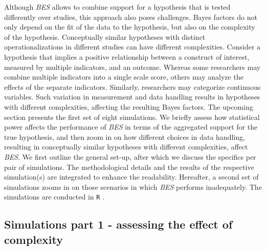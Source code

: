 \documentclass[
]{article}
\begin{document}
Although \emph{BES} allows to combine support for a hypothesis that is
tested differently over studies, this approach also poses challenges.
Bayes factors do not only depend on the fit of the data to the
hypothesis, but also on the complexity of the hypothesis. Conceptually
similar hypotheses with distinct operationalizations in different
studies can have different complexities. Consider a hypothesis that
implies a positive relationship between a construct of interest,
measured by multiple indicators, and an outcome. Whereas some
researchers may combine multiple indicators into a single scale score,
others may analyze the effects of the separate indicators. Similarly,
researchers may categorize continuous variables. Such variation in
measurement and data handling results in hypotheses with different
complexities, affecting the resulting Bayes factors. The upcoming
section presents the first set of eight simulations. We briefly assess
how statistical power affects the performance of \emph{BES} in terms of
the aggregated support for the true hypothesis, and then zoom in on how
different choices in data handling, resulting in conceptually similar
hypotheses with different complexities, affect \emph{BES}. We first
outline the general set-up, after which we discuss the specifics per
pair of simulations. The methodological details and the results of the
respective simulation(s) are integrated to enhance the readability.
Hereafter, a second set of simulations zooms in on those scenarios in
which \emph{BES} performs inadequately. The simulations are conducted in
\texttt{R} \citep[Version 4.1.0; a full simulation archive containing
all \texttt{R}-scripts and results is available on GitHub, see Data
Availability Statement]{R}.

\hypertarget{simulations-part-1---assessing-the-effect-of-complexity}{%
\subsection{Simulations part 1 - assessing the effect of
complexity}\label{simulations-part-1---assessing-the-effect-of-complexity}}
\end{document}

